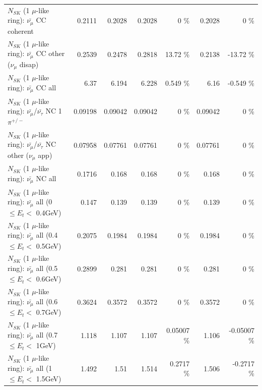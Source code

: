 \begin{table}
\begin{tabular}{| l | r | r | r  r | r  r |}
                       $N_{SK}$ (1 $\mu$-like ring): $\bar{\nu_\mu}$ CC coherent &          0.2111 &          0.2028 &          0.2028 &        0 \%  &          0.2028 &        0 \%  \\ 
        $N_{SK}$ (1 $\mu$-like ring): $\bar{\nu_\mu}$ CC other ($\nu_\mu$ disap) &          0.2539 &          0.2478 &          0.2818 &    13.72 \%  &          0.2138 &   -13.72 \%  \\ 
                          $N_{SK}$ (1 $\mu$-like ring): $\bar{\nu_{\mu}}$ CC all &            6.37 &           6.194 &           6.228 &    0.549 \%  &            6.16 &   -0.549 \%  \\ 
\hline
  $N_{SK}$ (1 $\mu$-like ring): $\bar{\nu_\mu}$/$\bar{\nu_\tau}$ NC 1$\pi^{+/-}$ &         0.09198 &         0.09042 &         0.09042 &        0 \%  &         0.09042 &        0 \%  \\ 
$N_{SK}$ (1 $\mu$-like ring): $\bar{\nu_\mu}$/$\bar{\nu_\tau}$ NC other ($\nu_\mu$ app) &         0.07958 &         0.07761 &         0.07761 &        0 \%  &         0.07761 &        0 \%  \\ 
                          $N_{SK}$ (1 $\mu$-like ring): $\bar{\nu_{\mu}}$ NC all &          0.1716 &           0.168 &           0.168 &        0 \%  &           0.168 &        0 \%  \\ 
\hline
   $N_{SK}$ (1 $\mu$-like ring): $\bar{\nu_{\mu}}$ all (0 $\leq E_{t} <$ 0.4GeV) &           0.147 &           0.139 &           0.139 &        0 \%  &           0.139 &        0 \%  \\ 
 $N_{SK}$ (1 $\mu$-like ring): $\bar{\nu_{\mu}}$ all (0.4 $\leq E_{t} <$ 0.5GeV) &          0.2075 &          0.1984 &          0.1984 &        0 \%  &          0.1984 &        0 \%  \\ 
 $N_{SK}$ (1 $\mu$-like ring): $\bar{\nu_{\mu}}$ all (0.5 $\leq E_{t} <$ 0.6GeV) &          0.2899 &           0.281 &           0.281 &        0 \%  &           0.281 &        0 \%  \\ 
 $N_{SK}$ (1 $\mu$-like ring): $\bar{\nu_{\mu}}$ all (0.6 $\leq E_{t} <$ 0.7GeV) &          0.3624 &          0.3572 &          0.3572 &        0 \%  &          0.3572 &        0 \%  \\ 
   $N_{SK}$ (1 $\mu$-like ring): $\bar{\nu_{\mu}}$ all (0.7 $\leq E_{t} <$ 1GeV) &           1.118 &           1.107 &           1.107 &  0.05007 \%  &           1.106 & -0.05007 \%  \\ 
   $N_{SK}$ (1 $\mu$-like ring): $\bar{\nu_{\mu}}$ all (1 $\leq E_{t} <$ 1.5GeV) &           1.492 &            1.51 &           1.514 &   0.2717 \%  &           1.506 &  -0.2717 \%  \\ 

\end{tabular}
\end{table}
